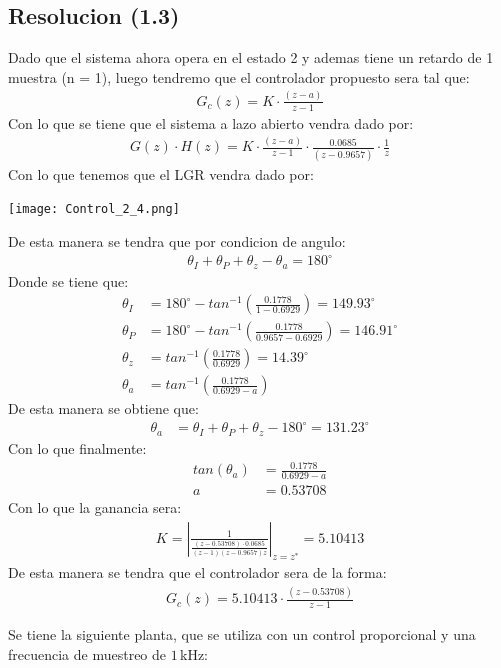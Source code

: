 \documentclass[
  11pt,
  letterpaper,
   addpoints,
   answers
  ]{exam}
\begin{document}
\begin{questions}
\begin{solution}
    \subsection*{Resolucion (1.3)}
    Dado que el sistema ahora opera en el estado 2 y ademas tiene un retardo de 1 muestra (n = 1), luego tendremo que el controlador propuesto sera tal que:
    \begin{align}
        G_{c}(z) = K \cdot \frac{(z-a)}{z-1}
    \end{align} 
    Con lo que se tiene que el sistema a lazo abierto vendra dado por:
    \begin{align}
        G(z) \cdot H(z) = K \cdot \frac{(z - a)}{z - 1} \cdot \frac{0.0685}{(z-0.9657)} \cdot \frac{1}{z}
    \end{align}
    Con lo que tenemos que el LGR vendra dado por:
    \begin{center}
        \texttt{[image: Control\_2\_4.png]}
    \end{center}
    De esta manera se tendra que por condicion de angulo:
    \begin{align}
        \theta_{I} + \theta_{P} + \theta_{z} - \theta_{a} = 180^{\circ}
    \end{align}
    Donde se tiene que:
    \begin{align}
        \theta_{I} &= 180^{\circ} - tan^{-1}\left(\frac{0.1778}{1- 0.6929}\right) = 149.93^{\circ}\\
        \theta_{P} &= 180^{\circ} - tan^{-1}\left(\frac{0.1778}{0.9657-0.6929}\right) = 146.91^{\circ}\\
        \theta_{z} &= tan^{-1}\left(\frac{0.1778}{0.6929}\right) = 14.39^{\circ}\\
        \theta_{a} &= tan^{-1}\left(\frac{0.1778}{0.6929-a}\right)
    \end{align}
    De esta manera se obtiene que:
    \begin{align}
        \theta_{a} & = \theta_{I} + \theta_{P} + \theta_{z} - 180^{\circ} = 131.23^{\circ}
    \end{align}
    Con lo que finalmente:
    \begin{align}
        tan(\theta_{a}) &= \frac{0.1778}{0.6929-a}\\
        a &= 0.53708 
    \end{align}
    Con lo que la ganancia sera:
    \begin{align}
        K = \left| \frac{1}{\frac{(z-0.53708)\cdot 0.0685 }{(z-1)(z-0.9657)z}}\right|_{z=z^{*}} = 5.10413
    \end{align}
    De esta manera se tendra que el controlador sera de la forma:
    \begin{align}
        G_{c}(z) = 5.10413 \cdot \frac{(z-0.53708)}{z-1}
    \end{align}
\end{solution}
\newpage
    \question 
    Se tiene la siguiente planta, que se utiliza con un control proporcional y una frecuencia de muestreo de $1\,$kHz:
    

\end{questions}
\end{document}
